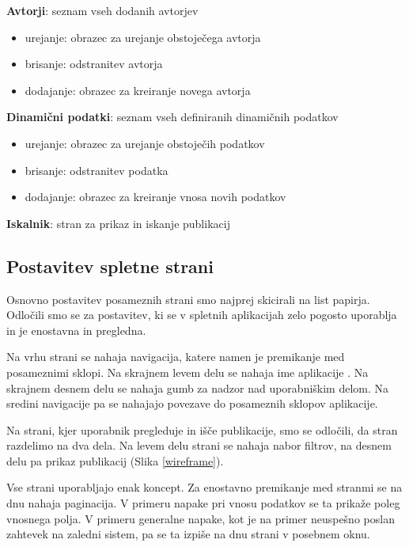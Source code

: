 \begin{description}
\item \textbf{Avtorji}: seznam vseh dodanih avtorjev
\begin{itemize}
\item urejanje: obrazec za urejanje obstoječega avtorja
\item brisanje: odstranitev avtorja
\item dodajanje: obrazec za kreiranje novega avtorja
\end{itemize}

\item \textbf{Dinamični podatki}: seznam vseh definiranih dinamičnih podatkov
\begin{itemize}
\item urejanje: obrazec za urejanje obstoječih podatkov
\item brisanje: odstranitev podatka
\item dodajanje: obrazec za kreiranje vnosa novih podatkov
\end{itemize}

\item \textbf{Iskalnik}: stran za prikaz in iskanje publikacij
\end{description}

\subsection{Postavitev spletne strani}
Osnovno postavitev posameznih strani smo najprej skicirali na list papirja. Odločili smo se za postavitev, ki se v spletnih aplikacijah zelo pogosto uporablja in je enostavna in pregledna.

Na vrhu strani se nahaja navigacija, katere namen je premikanje med posameznimi sklopi. Na skrajnem levem delu se nahaja ime aplikacije . Na skrajnem desnem delu se nahaja gumb za nadzor nad uporabniškim delom. Na sredini navigacije pa se nahajajo povezave do posameznih sklopov aplikacije.

Na strani, kjer uporabnik pregleduje in išče publikacije, smo se odločili, da stran razdelimo na dva dela. Na levem delu strani se nahaja nabor filtrov, na desnem delu pa prikaz publikacij (Slika \ref{wireframe}).

Vse strani uporabljajo enak koncept. Za enostavno premikanje med stranmi se na dnu nahaja paginacija. V primeru napake pri vnosu podatkov se ta prikaže poleg vnosnega polja. V primeru generalne napake, kot je na primer neuspešno poslan zahtevek na zaledni sistem, pa se ta izpiše na dnu strani v posebnem oknu.

